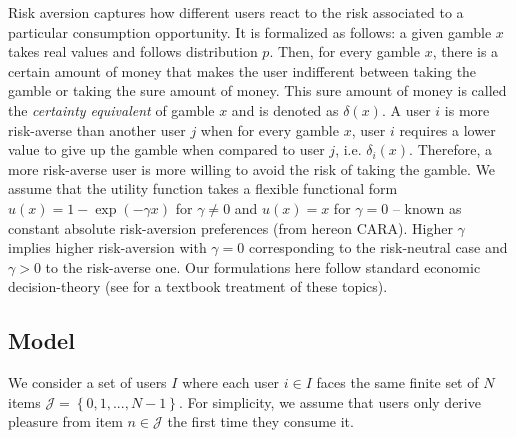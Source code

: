 \documentclass[format=acmsmall, review=false]{acmart}
\newcommand{\xhdr}[1]{\vspace{1mm} \noindent{\bf #1}}
\begin{document}
Risk aversion captures how different users react to the risk associated to a particular consumption opportunity. It is formalized as follows: a given gamble $x$ takes real values and follows distribution $p$. Then, for every gamble $x$, there is a certain amount of money that makes the user indifferent between taking the gamble or taking the sure amount of money. This sure amount of money is called the \textit{certainty equivalent} of gamble $x$ and is denoted as $\delta(x)$. A user $i$ is more risk-averse than another user $j$ when for every gamble $x$, user $i$ requires a lower value to give up the gamble when compared to user $j$, i.e. $\delta_i(x)$. Therefore, a more risk-averse user is more willing to avoid the risk of taking the gamble. We assume that the utility function takes a flexible functional form $u(x)=1-\exp(-\gamma x)$ for $\gamma\ne0$ and $u(x)=x$ for $\gamma=0$ -- known as constant absolute risk-aversion preferences (from hereon CARA). Higher $\gamma$ implies higher risk-aversion with $\gamma=0$ corresponding to the risk-neutral case and $\gamma>0$ to the risk-averse one. Our formulations here follow standard economic decision-theory (see \cite{mas1995microeconomic} for a textbook treatment of these topics).
\par

\subsection{Model}
\par
\xhdr{Users.} We consider a set of users $I$ where each user $i \in I$ faces the same finite set of $N$ items $\mathcal J = \left\{0,1,...,N-1\right\}$. For simplicity, we assume that users only derive pleasure from item $n \in \mathcal{J}$ the first time they consume it.
\par
\end{document}
